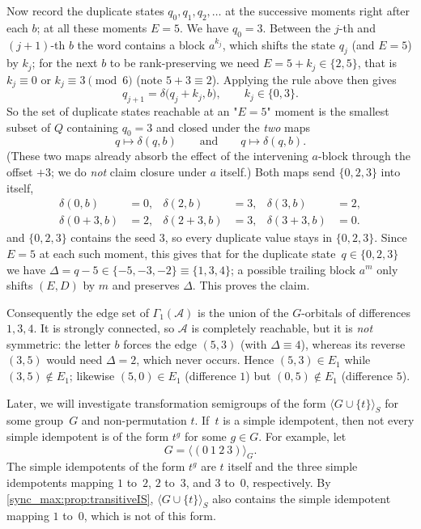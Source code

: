 \begin{remark}
	Now record the duplicate states $q_0,q_1,q_2,\dots$ at the successive moments right after each $b$; at all
	these moments $E=5$. We have $q_0=3$. Between the $j$-th and $(j{+}1)$-th $b$ the word contains a block
	$a^{k_j}$, which shifts the state $q_j$ (and $E=5$) by $k_j$; for the next $b$ to be rank-preserving we
	need $E=5+k_j\in\{2,5\}$, that is $k_j\equiv 0$ or $k_j\equiv 3\pmod 6$ (note $5+3\equiv 2$). Applying the
	rule above then gives
	\[
	q_{j+1}=\delta\bigl(q_j+k_j, b\bigr),\qquad k_j\in\{0,3\}.
	\]
	So the set of duplicate states reachable at an "$E=5$" moment is the smallest subset of $Q$
	containing $q_0=3$ and closed under the \emph{two} maps
	\[
	q\longmapsto \delta(q, b)\qquad\text{and}\qquad q\longmapsto \delta(q,b).
	\]
	(These two maps already absorb the effect of the intervening $a$-block through the offset $+3$; we do
	\emph{not} claim closure under $a$ itself.) Both maps send $\{0,2,3\}$ into itself,
	\[
	\begin{aligned}
		\delta(0,b)&=0, & \delta(2,b)&=3, & \delta(3,b)&=2,\\
		\delta(0{+}3,b)&=2, & \delta(2{+}3,b)&=3, & \delta(3{+}3,b)&=0.
	\end{aligned}
	\]
	and $\{0,2,3\}$ contains the seed $3$, so every duplicate value stays in $\{0,2,3\}$. Since $E=5$ at each
	such moment, this gives that for the duplicate state~$q \in \{0,2,3\}$ we have 
	$\Delta = q-5\in\{-5,-3,-2\}\equiv\{1,3,4\}$; a possible trailing block
	$a^{m}$ only shifts $(E,D)$ by $m$ and preserves $\Delta$. This proves the claim.
	
	Consequently the edge set of $\Gamma_1(\mathcal A)$
	is the union of the $G$-orbitals of differences $1,3,4$.
	It is strongly connected, so $\mathcal A$
	is completely reachable, but it is \emph{not} symmetric: the letter $b$ forces the edge $(5,3)$ (with
	$\Delta\equiv 4$), whereas its reverse $(3,5)$ would need $\Delta=2$, which never occurs. Hence
	$(5,3)\in E_1$ while $(3,5)\notin E_1$; likewise $(5,0)\in E_1$ (difference $1$) but
	$(0,5)\notin E_1$ (difference $5$).
\end{remark}

\begin{remark}
	Later, we will investigate transformation semigroups of the form
	$\langle G \cup \{t\} \rangle_S$ for some group~$G$ and non-permutation
	$t$.
	If~$t$ is a simple idempotent, then not every simple idempotent is of the
	form $t^g$ for some $g\in G$.
	For example, let
	\[
	G=\langle (0~1~2~3)\rangle_G.
	\]
	The simple idempotents of the form $t^g$ are
	$t$ itself and the three simple idempotents mapping
	$1$ to~$2$, $2$ to~$3$, and $3$ to~$0$, respectively.
	By \cref{sync_max:prop:transitiveIS}, $\langle G \cup \{t\} \rangle_S$ also
	contains the simple idempotent mapping $1$ to~$0$, which is not of this
	form.
\end{remark}


